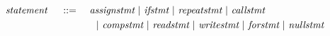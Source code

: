 \[ \begin{aligned}
	~\emph{statement}~ \quad ::= \quad
		& ~\emph{assignstmt}~ | ~\emph{ifstmt}~ | ~\emph{repeatstmt}~ | ~\emph{callstmt}~ \\
		& \quad | ~\emph{compstmt}~ | ~\emph{readstmt}~ | ~\emph{writestmt}~ | ~\emph{forstmt}~ | ~\emph{nullstmt}~
\end{aligned} \]